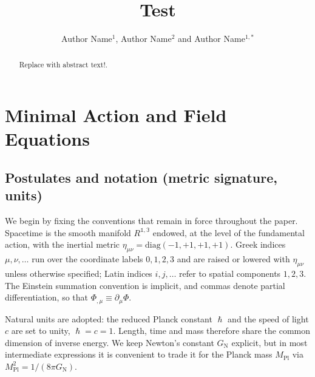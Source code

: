 \documentclass{iopjournal}
\begin{document}

\title{Test}

\author{Author Name$^1$, Author Name$^2$ and Author Name$^{1,*}$}






\begin{abstract}
Replace with abstract text!.
\end{abstract}


\setcounter{section}{1}
\section{Minimal Action and Field Equations}

\subsection{Postulates and notation (metric signature, units)}

We begin by fixing the conventions that remain in force throughout the paper. Spacetime is the smooth manifold $R^{\mathbb{1},\mathbb{3}}$ endowed, at the level of the fundamental action, with the inertial metric $\eta_{\mu \nu }=\mathrm{diag}\left(-1,+1,+1,+1\right)$. Greek indices $\mu ,\nu ,\mathrm{\dots }$ run over the coordinate labels $0,1,2,3$ and are raised or lowered with ${\eta }_{\mu \nu }$ unless otherwise specified; Latin indices $i,j,\mathrm{\dots }$ refer to spatial components $1,2,3$. The Einstein summation convention is implicit, and commas denote partial differentiation, so that ${\Phi}_{,\mu }\equiv {\partial }_{\mu }\Phi$.

Natural units are adopted: the reduced Planck constant $\hslash $ and the speed of light $c$ are set to unity, $\mathrm{\hslash }=c=1$. Length, time and mass therefore share the common dimension of inverse energy. We keep Newton's constant $G_{\mathrm{N}}$ explicit, but in most intermediate expressions it is convenient to trade it for the Planck mass $M_{\mathrm{Pl}}$ via $M^2_{\mathrm{Pl}}=1/\left(8\pi G_{\mathrm{N}}\right)$.
\end{document}
